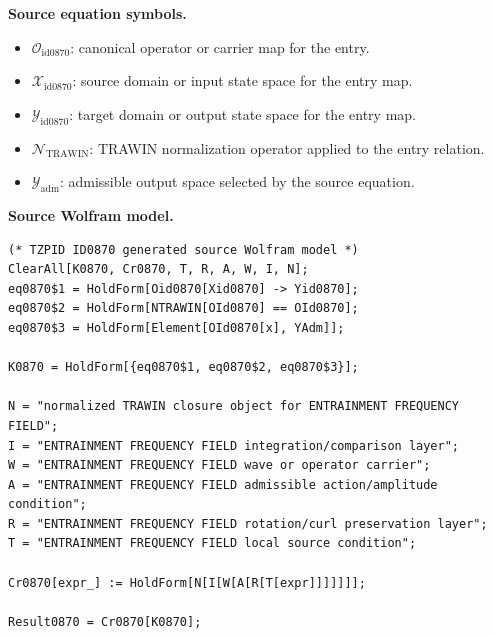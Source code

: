 \begin{minipage}[t]{0.49\linewidth}
\begingroup
\small
\raggedright
\textbf{Source equation symbols.}\par
\begin{itemize}[leftmargin=1.35em,itemsep=1pt,topsep=1pt,parsep=0pt]
    \item $\mathcal{O}_{\mathrm{id0870}}$: canonical operator or carrier map for the entry.
    \item $\mathcal{X}_{\mathrm{id0870}}$: source domain or input state space for the entry map.
    \item $\mathcal{Y}_{\mathrm{id0870}}$: target domain or output state space for the entry map.
    \item $\mathcal{N}_{\mathrm{TRAWIN}}$: TRAWIN normalization operator applied to the entry relation.
    \item $\mathcal{Y}_{\mathrm{adm}}$: admissible output space selected by the source equation.
\end{itemize}
\endgroup
\end{minipage}\hfill
\begin{minipage}[t]{0.47\linewidth}
\begingroup
\scriptsize
\raggedright
\textbf{Source Wolfram model.}\par
\begin{Verbatim}[fontsize=\tiny,breaklines=true,breakanywhere=true]
(* TZPID ID0870 generated source Wolfram model *)
ClearAll[K0870, Cr0870, T, R, A, W, I, N];
eq0870$1 = HoldForm[Oid0870[Xid0870] -> Yid0870];
eq0870$2 = HoldForm[NTRAWIN[OId0870] == OId0870];
eq0870$3 = HoldForm[Element[OId0870[x], YAdm]];

K0870 = HoldForm[{eq0870$1, eq0870$2, eq0870$3}];

N = "normalized TRAWIN closure object for ENTRAINMENT FREQUENCY FIELD";
I = "ENTRAINMENT FREQUENCY FIELD integration/comparison layer";
W = "ENTRAINMENT FREQUENCY FIELD wave or operator carrier";
A = "ENTRAINMENT FREQUENCY FIELD admissible action/amplitude condition";
R = "ENTRAINMENT FREQUENCY FIELD rotation/curl preservation layer";
T = "ENTRAINMENT FREQUENCY FIELD local source condition";

Cr0870[expr_] := HoldForm[N[I[W[A[R[T[expr]]]]]]];

Result0870 = Cr0870[K0870];
\end{Verbatim}
\endgroup
\end{minipage}

